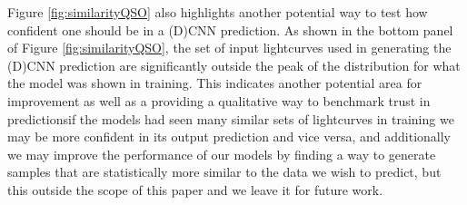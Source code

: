 \documentclass[floatfix,twocolumn,trackchanges,linenumbers]{aastex7}
\begin{document}
Figure \ref{fig:similarityQSO} also highlights another potential way to test how confident one should be in a (D)CNN prediction. As shown in the bottom panel of Figure \ref{fig:similarityQSO}, the set of input lightcurves used in generating the (D)CNN prediction are significantly outside the peak of the distribution for what the model was shown in training. This indicates another potential area for improvement as well as a providing a qualitative way to benchmark trust in predictions\textemdash if the models had seen many similar sets of lightcurves in training we may be more confident in its output prediction and vice versa, and additionally we may improve the performance of our models by finding a way to generate samples that are statistically more similar to the data we wish to predict, but this outside the scope of this paper and we leave it for future work.



\end{document}
